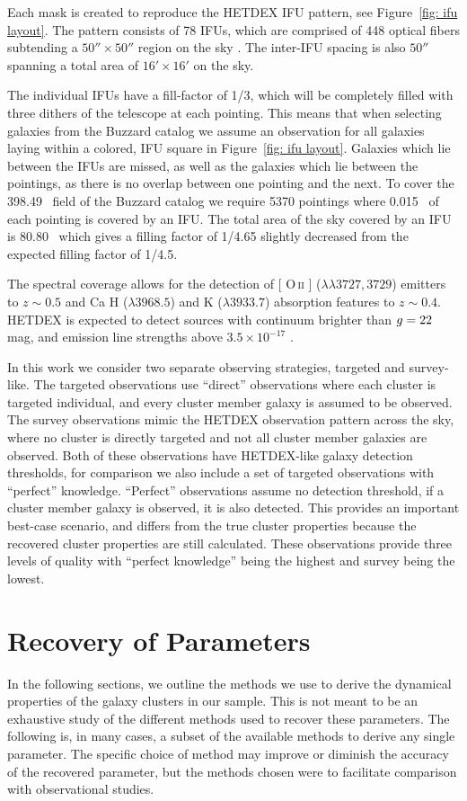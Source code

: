 \documentclass[fleqn,usenatbib]{mnras}
\makeatletter
\DeclareRobustCommand{\ion}[2]{%
\relax\ifmmode
\ifx\testbx\f@series
{\mathbf{#1\,\mathsc{#2}}}\else
{\mathrm{#1\,\mathsc{#2}}}\fi
\else\textup{#1\,{\mdseries\textsc{#2}}}%
\fi}
\makeatother
\begin{document}
Each mask is created to reproduce the HETDEX IFU pattern, see Figure~\ref{fig: ifu layout}. The pattern consists of 78 IFUs, which are comprised of 448 optical fibers subtending a $50'' \times 50''$ region on the sky \citep{Kelz2014}. The inter-IFU spacing is also $50''$ spanning a total area of $16'\times 16'$ on the sky. 

The individual IFUs have a fill-factor of 1/3, which will be completely filled with three dithers of the telescope at each pointing. This means that when selecting galaxies from the Buzzard catalog we assume an observation for all galaxies laying within a colored, IFU square in Figure~\ref{fig: ifu layout}. Galaxies which lie between the IFUs are missed, as well as the galaxies which lie between the pointings, as there is no overlap between one pointing and the next. To cover the 398.49 \degsq\ field of the Buzzard catalog we require 5370 pointings where 0.015 \degsq\ of each pointing is covered by an IFU. The total area of the sky covered by an IFU is 80.80 \degsq\ which gives a filling factor of 1/4.65 slightly decreased from the expected filling factor of 1/4.5.

The spectral coverage allows for the detection of [\ion{O}{ii}] ($\lambda\lambda 3727,3729$) emitters to $z\sim 0.5$ and Ca H ($\lambda 3968.5$) and K ($\lambda 3933.7$) absorption features to $z\sim 0.4$. HETDEX is expected to detect sources with continuum brighter than $\hbox{$g$}=22$ mag, and emission line strengths above $3.5\times10^{-17}$ \ergscm.

In this work we consider two separate observing strategies, targeted and survey-like. The targeted observations use ``direct'' observations where each cluster is targeted individual, and every cluster member galaxy is assumed to be observed. The survey observations mimic the HETDEX observation pattern across the sky, where no cluster is directly targeted and not all cluster member galaxies are observed. Both of these observations have HETDEX-like galaxy detection thresholds, for comparison we also include a set of targeted observations with ``perfect'' knowledge. ``Perfect'' observations assume no detection threshold, if a cluster member galaxy is observed, it is also detected. This provides an important best-case scenario, and differs from the true cluster properties because the recovered cluster properties are still calculated. These observations provide three levels of quality with ``perfect knowledge'' being the highest and survey being the lowest.

\section{Recovery of Parameters}\label{sec:recovery}
 In the following sections, we outline the methods we use to derive the dynamical properties of the galaxy clusters in our sample. This is not meant to be an exhaustive study of the different methods used to recover these parameters. The following is, in many cases, a subset of the available methods to derive any single parameter. The specific choice of method may improve or diminish the accuracy of the recovered parameter, but the methods chosen were to facilitate comparison with observational studies. 
\end{document}
